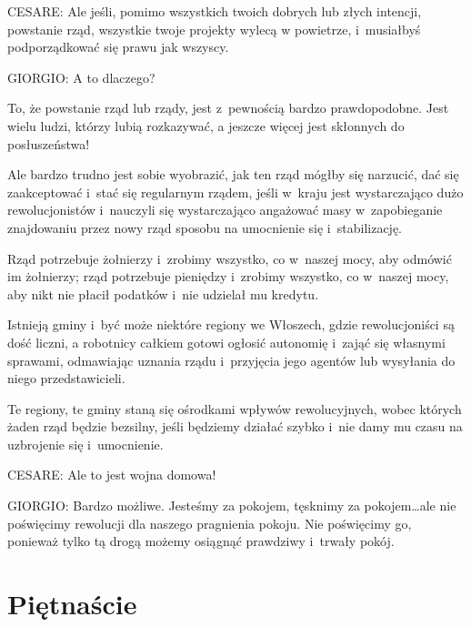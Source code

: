 \documentclass[oneside,polish,11pt,sfheadings]{mwbk}
\begin{document}
 
\noindent CESARE: Ale jeśli, pomimo wszystkich twoich dobrych lub złych intencji, powstanie rząd, wszystkie twoje projekty wylecą
w powietrze, i~musiałbyś podporządkować się prawu jak wszyscy. 




 
\noindent GIORGIO: A to dlaczego? 

 
To, że powstanie rząd lub rządy, jest z~pewnością bardzo prawdopodobne. Jest wielu ludzi, którzy lubią rozkazywać, a
jeszcze więcej jest skłonnych do posłuszeństwa! 

 
Ale bardzo trudno jest sobie wyobrazić, jak ten rząd mógłby się narzucić, dać się zaakceptować i~stać się regularnym
rządem, jeśli w~kraju jest wystarczająco dużo rewolucjonistów i~nauczyli się wystarczająco angażować masy w~zapobieganie znajdowaniu przez nowy rząd sposobu na umocnienie się i~stabilizację. 

 
Rząd potrzebuje żołnierzy i~zrobimy wszystko, co w~naszej mocy, aby odmówić im żołnierzy; rząd potrzebuje pieniędzy i~zrobimy wszystko, co w~naszej mocy, aby nikt nie płacił podatków i~nie udzielał mu kredytu. 

 
Istnieją gminy i~być może niektóre regiony we Włoszech, gdzie rewolucjoniści są dość liczni, a robotnicy całkiem gotowi
ogłosić autonomię i~zająć się własnymi sprawami, odmawiając uznania rządu i~przyjęcia jego agentów lub wysyłania do
niego przedstawicieli. 

 
Te regiony, te gminy staną się ośrodkami wpływów rewolucyjnych, wobec których żaden rząd będzie bezsilny, jeśli będziemy
działać szybko i~nie damy mu czasu na uzbrojenie się i~umocnienie. 




 
\noindent CESARE: Ale to jest wojna domowa! 




 
\noindent GIORGIO: Bardzo możliwe. Jesteśmy za pokojem, tęsknimy za pokojem\ldots ale nie poświęcimy rewolucji dla naszego pragnienia
pokoju. Nie poświęcimy go, ponieważ tylko tą drogą możemy osiągnąć prawdziwy i~trwały pokój. 










\chapter*{Piętnaście}
\end{document}
